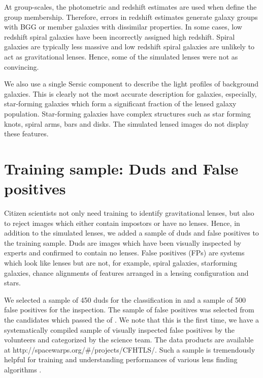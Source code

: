 \documentclass[useAMS,usenatbib,a4paper]{mn2e}
\begin{document}
At group-scales, the photometric and redshift estimates are used when define
the group membership. Therefore, errors in redshift estimates generate galaxy
groups with BGG or member galaxies with dissimilar properties. In some cases,
low redshift spiral galaxies have been incorrectly assigned high redshift.
Spiral galaxies are typically less massive and low redshift spiral galaxies are
unlikely to act as gravitational lenses. Hence, some of the simulated lenses
were not as convincing.

We also use a single Sersic component to describe the light profiles of
background galaxies. This is clearly not the most accurate description for
galaxies, especially, star-forming galaxies which form a significant fraction
of the lensed galaxy population. Star-forming galaxies have complex structures
such as star forming knots, spiral arms, bars and disks. The simulated lensed
images do not display these features.


%


\section{Training sample: Duds and False positives}
\label{sec:dfp}

Citizen scientists not only need training to identify gravitational lenses, but
also to reject images which either contain impostors or have no lenses. Hence,
in addition to the simulated lenses, we added a sample of duds and false
positives to the training sample. Duds are images which have been visually
inspected by experts and confirmed to contain no lenses.  False positives (FPs)
are systems which look like lenses but are not, for example, spiral galaxies,
starforming galaxies, chance alignments of features arranged in a lensing
configuration and stars.

We selected a sample of 450 duds for the \StageOne classification in \sw
and a sample of 500 false positives for the \StageTwo inspection. The
sample of false positives was selected from the candidates which passed
the \StageOne of \sw. We note that this is the first time, we have a
systematically compiled sample of visually inspected false positives by
the \sw volunteers and categorized by the science team. The data products are
available at http://spacewarps.org/\#/projects/CFHTLS/. Such a sample is
tremendously helpful for training and understanding performances of
various lens finding algorithms \citep{Chan2014}.
\end{document}
